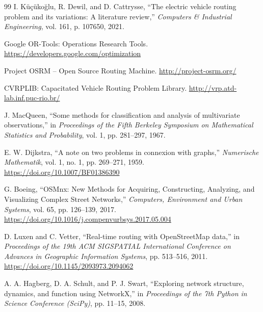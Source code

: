\documentclass[11pt,a4paper]{article}
\begin{document}
\begin{thebibliography}{99}
 I. K\"{u}\c{c}\"{u}ko\u{g}lu, R. Dewil, and D. Cattrysse, ``The electric vehicle routing problem and its variations: A literature review,'' \emph{Computers \& Industrial Engineering}, vol. 161, p. 107650, 2021.

 Google OR-Tools: Operations Research Tools. \url{https://developers.google.com/optimization}

 Project OSRM -- Open Source Routing Machine. \url{http://project-osrm.org/}

 CVRPLIB: Capacitated Vehicle Routing Problem Library. \url{http://vrp.atd-lab.inf.puc-rio.br/}

 J. MacQueen, ``Some methods for classification and analysis of multivariate observations,'' in \emph{Proceedings of the Fifth Berkeley Symposium on Mathematical Statistics and Probability}, vol. 1, pp. 281--297, 1967.

 E. W. Dijkstra, ``A note on two problems in connexion with graphs,'' \emph{Numerische Mathematik}, vol. 1, no. 1, pp. 269--271, 1959. \url{https://doi.org/10.1007/BF01386390}

 G. Boeing, ``OSMnx: New Methods for Acquiring, Constructing, Analyzing, and Visualizing Complex Street Networks,'' \emph{Computers, Environment and Urban Systems}, vol. 65, pp. 126--139, 2017. \url{https://doi.org/10.1016/j.compenvurbsys.2017.05.004}

 D. Luxen and C. Vetter, ``Real-time routing with OpenStreetMap data,'' in \emph{Proceedings of the 19th ACM SIGSPATIAL International Conference on Advances in Geographic Information Systems}, pp. 513--516, 2011. \url{https://doi.org/10.1145/2093973.2094062}

 A. A. Hagberg, D. A. Schult, and P. J. Swart, ``Exploring network structure, dynamics, and function using NetworkX,'' in \emph{Proceedings of the 7th Python in Science Conference (SciPy)}, pp. 11--15, 2008.

\end{thebibliography}
\end{document}
